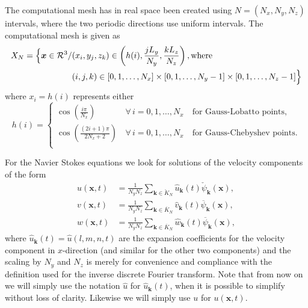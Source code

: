 \documentclass[11pt, oneside]{article}
\newcommand{\N}[1]{\check{#1}}
\newcommand{\D}[1]{\overline{#1}}
\begin{document}
The computational mesh has in real space been created using $N = (N_x, N_y, 
N_z)$ 
intervals, where the two periodic directions use uniform intervals. The 
computational mesh is given as
\begin{align}
  X_N = \Big\{ \bm{x} \in \mathcal{R}^3/&(x_i, y_j, z_k) \in \left( h(i), \frac{jL_y}{N_y}, \frac{kL_z}{N_z} \right), \text{where} \notag \\
  &(i, j, k) \in [0, 1, \ldots, N_x] \times [0, 1, \ldots, N_y-1] \times [0, 1, \ldots, N_z-1] \Big\} \label{eq:Xn}
\end{align}
where $x_i = h(i)$ represents either
\begin{equation}
 h(i) = \begin{cases}
   \cos \left(\frac{i \pi }{N_x} \right) \, &\forall \, i=0,1, \ldots, N_x \quad  \text{for Gauss-Lobatto points}, \\
   \cos \left(\frac{(2i +1)\pi}{2N_x+2} \right) \, &\forall \, i=0,1, \ldots, N_x \quad  \text{for Gauss-Chebyshev points}. \\
 \end{cases}
\end{equation}

For the Navier Stokes equations we look for solutions of the velocity 
components of the form
\begin{align}
u(\bm{x}, t) &= \frac{1}{N_yN_z}\sum_{\bm{k} \in \N{K}_N} \hat{u}_{\bm{k}}(t) 
\N{\psi}_{\bm{k}}(\bm{x}), \label{eq:u_solx} \\
v(\bm{x}, t) &= \frac{1}{N_yN_z}\sum_{\bm{k} \in \D{K}_N} \hat{v}_{\bm{k}}(t) 
\D{\psi}_{\bm{k}}(\bm{x}), \label{eq:u_soly} \\
w(\bm{x}, t) &= \frac{1}{N_yN_z}\sum_{\bm{k} \in \D{K}_N} \hat{w}_{\bm{k}}(t) 
\D{\psi}_{\bm{k}}(\bm{x}), \label{eq:u_solz}
\end{align}
where $\hat{u}_{\bm{k}}(t) = \hat{u}(l, {m}, {n}, t)$ are the expansion 
coefficients for the velocity component in $x$-direction (and similar for the 
other two components) and the scaling by $N_y$ and $N_z$ is merely for 
convenience 
and compliance with the definition used for the inverse discrete Fourier 
transform. Note that from now on we will simply use the notation $\hat{u}$ for 
$\hat{u}_{\bm{k}}(t)$, when it is possible to simplify without loss of clarity. 
Likewise we will simply use $u$ for $u(\bm{x}, t)$. 
\end{document}
